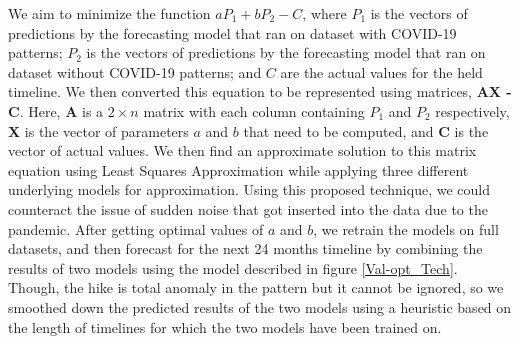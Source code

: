 \documentclass[10pt,journal,compsoc]{IEEEtran}
\begin{document}
We aim to minimize the function \(aP_{1} + bP_{2} - C\), where \(P_{1}\) is the vectors of predictions by the forecasting model that ran on dataset with COVID-19 patterns; \(P_{2}\) is the vectors of predictions by the forecasting model that ran on dataset without COVID-19 patterns; and \(C\) are the actual values for the held timeline. We then converted this equation to be represented using matrices, \textbf{AX - C}. Here, \textbf{A} is a \(2\times n\) matrix with each column containing \(P_{1}\) and \(P_{2}\) respectively, \textbf{X} is the vector of parameters \(a\) and \(b\) that need to be computed, and \textbf{C} is the vector of actual values. We then find an approximate solution to this matrix equation using Least Squares Approximation while applying three different underlying models for approximation. Using this proposed technique, we could counteract the issue of sudden noise that got inserted into the data due to the pandemic. After getting optimal values of \(a\) and \(b\), we retrain the models on full datasets, and then forecast for the next 24 months timeline by combining the results of two models using the model described in figure \ref{Val-opt_Tech}. Though, the hike is total anomaly in the pattern but it cannot be ignored, so we smoothed down the predicted results of the two models using a heuristic based on the length of timelines for which the two models have been trained on.

\end{document}
